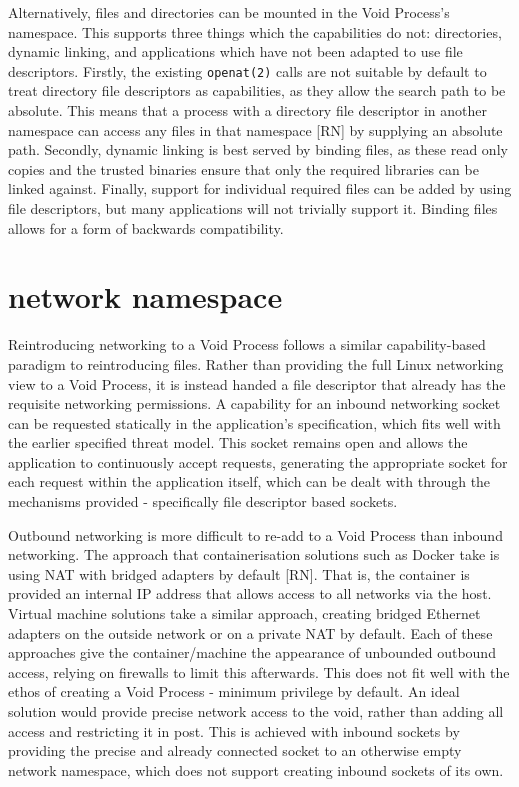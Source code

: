 \documentclass[a4paper,12pt,twoside,openright]{report}
\begin{document}
Alternatively, files and directories can be mounted in the Void Process's namespace. This supports three things which the capabilities do not: directories, dynamic linking, and applications which have not been adapted to use file descriptors. Firstly, the existing \texttt{openat(2)} calls are not suitable by default to treat directory file descriptors as capabilities, as they allow the search path to be absolute. This means that a process with a directory file descriptor in another namespace can access any files in that namespace [RN] by supplying an absolute path. Secondly, dynamic linking is best served by binding files, as these read only copies and the trusted binaries ensure that only the required libraries can be linked against. Finally, support for individual required files can be added by using file descriptors, but many applications will not trivially support it. Binding files allows for a form of backwards compatibility.

\section{network namespace}
\label{sec:filling-net}

Reintroducing networking to a Void Process follows a similar capability-based paradigm to reintroducing files. Rather than providing the full Linux networking view to a Void Process, it is instead handed a file descriptor that already has the requisite networking permissions. A capability for an inbound networking socket can be requested statically in the application's specification, which fits well with the earlier specified threat model. This socket remains open and allows the application to continuously accept requests, generating the appropriate socket for each request within the application itself, which can be dealt with through the mechanisms provided - specifically file descriptor based sockets.

Outbound networking is more difficult to re-add to a Void Process than inbound networking. The approach that containerisation solutions such as Docker take is using NAT with bridged adapters by default [RN]. That is, the container is provided an internal IP address that allows access to all networks via the host. Virtual machine solutions take a similar approach, creating bridged Ethernet adapters on the outside network or on a private NAT by default. Each of these approaches give the container/machine the appearance of unbounded outbound access, relying on firewalls to limit this afterwards. This does not fit well with the ethos of creating a Void Process - minimum privilege by default. An ideal solution would provide precise network access to the void, rather than adding all access and restricting it in post. This is achieved with inbound sockets by providing the precise and already connected socket to an otherwise empty network namespace, which does not support creating inbound sockets of its own.
\end{document}
